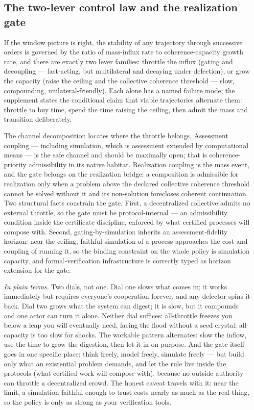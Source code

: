 \documentclass[11pt]{article}
\theoremstyle{definition}
\newcommand{\plainterms}{\emph{In plain terms.}}
\begin{document}
\subsection{The two-lever control law and the realization gate}

If the window picture is right, the stability of any trajectory through successive orders is governed by the ratio of mass-influx rate to coherence-capacity growth rate, and there are exactly two lever families: throttle the influx (gating and decoupling --- fast-acting, but multilateral and decaying under defection), or grow the capacity (raise the ceiling and the collective coherence threshold --- slow, compounding, unilateral-friendly). Each alone has a named failure mode; the supplement states the conditional claim that viable trajectories alternate them: throttle to buy time, spend the time raising the ceiling, then admit the mass and transition deliberately.

The channel decomposition locates where the throttle belongs. Assessment coupling --- including simulation, which is assessment extended by computational means --- is the safe channel and should be maximally open; that is coherence-priority admissibility in its native habitat. Realization coupling is the mass event, and the gate belongs on the realization bridge: a composition is admissible for realization only when a problem above the declared collective coherence threshold cannot be solved without it and its non-solution forecloses coherent continuation. Two structural facts constrain the gate. First, a decentralized collective admits no external throttle, so the gate must be protocol-internal --- an admissibility condition inside the certificate discipline, enforced by what certified processes will compose with. Second, gating-by-simulation inherits an assessment-fidelity horizon: near the ceiling, faithful simulation of a process approaches the cost and coupling of running it, so the binding constraint on the whole policy is simulation capacity, and formal-verification infrastructure is correctly typed as horizon extension for the gate.

\noindent\plainterms{} Two dials, not one. Dial one slows what comes in; it works immediately but requires everyone's cooperation forever, and any defector spins it back. Dial two grows what the system can digest; it is slow, but it compounds and one actor can turn it alone. Neither dial suffices: all-throttle freezes you below a leap you will eventually need, facing the flood without a seed crystal; all-capacity is too slow for shocks. The workable pattern alternates: slow the inflow, use the time to grow the digestion, then let it in on purpose. And the gate itself goes in one specific place: think freely, model freely, simulate freely --- but build only what an existential problem demands, and let the rule live inside the protocols (what certified work will compose with), because no outside authority can throttle a decentralized crowd. The honest caveat travels with it: near the limit, a simulation faithful enough to trust costs nearly as much as the real thing, so the policy is only as strong as your verification tools.
\end{document}
